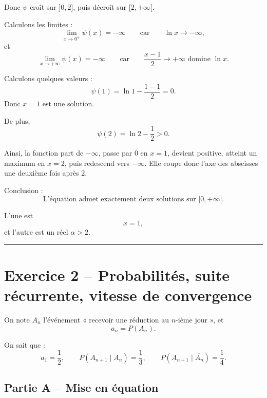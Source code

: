 \documentclass[11pt,a4paper]{article}
\begin{document}
\begin{enumerate}[label=\textbf{1.\arabic*}, resume, leftmargin=1.6em]
Donc \(\psi\) croît sur \(]0,2]\), puis décroît sur \([2,+\infty[\).

Calculons les limites :
\[
\lim_{x\to 0^+}\psi(x)=-\infty
\qquad\text{car}\qquad
\ln x\to -\infty,
\]
et
\[
\lim_{x\to +\infty}\psi(x)=-\infty
\qquad\text{car}\qquad
\frac{x-1}{2}\to +\infty \text{ domine } \ln x.
\]

Calculons quelques valeurs :
\[
\psi(1)=\ln 1-\frac{1-1}{2}=0.
\]
Donc \(x=1\) est une solution.

De plus,
\[
\psi(2)=\ln 2-\frac12>0.
\]

Ainsi, la fonction part de \(-\infty\), passe par \(0\) en \(x=1\), devient positive, atteint un maximum en \(x=2\), puis redescend vers \(-\infty\). Elle coupe donc l’axe des abscisses une deuxième fois après \(2\).

Conclusion :
\[
\boxed{\text{L’équation admet exactement deux solutions sur } ]0,+\infty[.}
\]

L’une est
\[
\boxed{x=1,}
\]
et l’autre est un réel \(\alpha>2\).

\end{enumerate}

\vspace{0.6em}
\hrule
\vspace{0.6em}

\section*{Exercice 2 -- Probabilités, suite récurrente, vitesse de convergence}

On note \(A_n\) l’événement « recevoir une réduction au \(n\)-ième jour », et
\[
a_n=P(A_n).
\]

On sait que :
\[
a_1=\frac12,
\qquad
P(A_{n+1}\mid A_n)=\frac13,
\qquad
P(A_{n+1}\mid \overline{A_n})=\frac14.
\]

\subsection*{Partie A -- Mise en équation}
\end{document}
